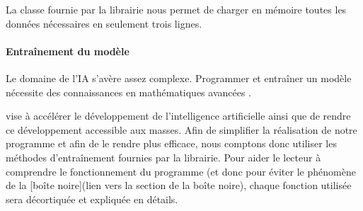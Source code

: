 \documentclass[letterpaper,10pt,french]{sphinxmanual}
\begin{document}
\begin{sphinxVerbatim}[commandchars=\\\{\}]
     
  \PYG{p}{[} \PYG{p}{]}
  \PYG{p}{[} \PYG{p}{]}
\end{sphinxVerbatim}

La classe  fournie par la librairie nous permet de charger en mémoire toutes les données nécessaires en seulement trois lignes.


\paragraph{Entraînement du modèle}
\label{\detokenize{explications_librairies:entrainement-du-modele}}
Le domaine de l’IA s’avère assez complexe. Programmer et entraîner un modèle nécessite des connaissances en mathématiques avancées .

vise à accélérer le développement de l’intelligence artificielle ainsi que de rendre ce développement accessible aux masses. Afin de simplifier la réalisation de notre programme et afin de le rendre plus efficace, nous comptons donc utiliser les méthodes d’entraînement fournies par la librairie. Pour aider le lecteur à comprendre le fonctionnement du programme (et donc pour éviter le phénomène de la {[}boîte noire{]}(lien vers la section de la boîte noire), chaque fonction utilisée sera décortiquée et expliquée en détails.
\end{document}
